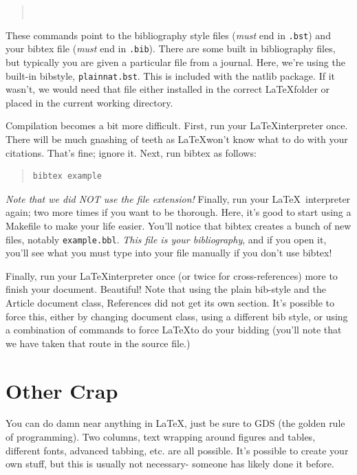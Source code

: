 \documentclass[12pt, letterpaper]{article}
\begin{document}
\begin{quote}
\begin{verbatim}


\end{verbatim}
\end{quote} 

These commands point to the bibliography style files (\emph{must} end in 
{\tt .bst}) and your bibtex file (\emph{must} end in {\tt .bib}).  There are 
some built in bibliography files, but typically you are given a particular file
 from a journal.  Here, we're using the built-in bibstyle, {\tt plainnat.bst}.
This is included with the natlib package.  If it wasn't, we would need that 
file either installed in the correct \LaTeX folder or placed in the current
working directory.

Compilation becomes a bit more difficult.  First, run your \LaTeX interpreter 
once.  There will be much gnashing of teeth as \LaTeX won't know what to do 
with your citations.  That's fine; ignore it.  Next, run bibtex as follows:

\begin{quote}
\begin{verbatim}
bibtex example
\end{verbatim}
\end{quote}

\emph{Note that we did NOT use the file extension!}  Finally, run your \LaTeX\ 
interpreter again; two more times if you want to be thorough.   Here, it's good
to start using a Makefile to make your life easier.  You'll notice that bibtex 
creates a bunch of new files, notably {\tt example.bbl}.  
\emph{This file is your bibliography}, and if you open it, you'll see what you 
must type into your file manually if you don't use bibtex!

Finally, run your \LaTeX interpreter once (or twice for cross-references) more 
to finish your document.  Beautiful!  Note that using the plain bib-style and 
the Article document class, References did not get its own section.  It's 
possible to force this, either by changing document class, using a different 
bib style, or using a combination of commands to force \LaTeX to do your 
bidding (you'll note that we have taken that route in the source file.)

\section{Other Crap}
You can do damn near anything in \LaTeX, just be sure to GDS (the golden rule of
programming).  Two columns, text wrapping around figures and tables, different
fonts, advanced tabbing, etc. are all possible.  It's possible to create your
own stuff, but this is usually not necessary- someone has likely done it before.

\clearpage
{}



\end{document}
